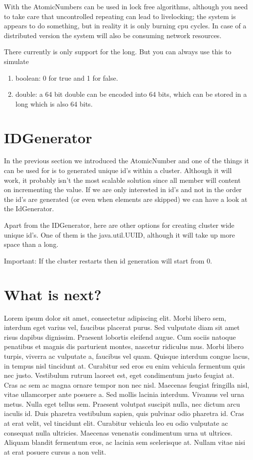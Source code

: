 With the AtomicNumbers can be used in lock free algorithms, although you need to 
take care that uncontrolled repeating can lead to livelocking; the system is appears to do
something, but in reality it is only burning cpu cycles. In case of a distributed version 
the system will also be consuming network resources. 

There currently is only support for the long. But you can always use this to simulate
\begin{enumerate}
\item boolean: 0 for true and 1 for false.
\item double: a 64 bit double can be encoded into 64 bits, which can be stored in a long which is also 64 bits.
\end{enumerate}

\section{IDGenerator}

In the previous section we introduced the AtomicNumber and one of the things it
can be used for is to generated unique id's within a cluster. Although it will work,
it probably isn't the most scalable solution since all member will content on incrementing
the value. If we are only interested in id's and not in the order the id's are generated 
(or even when elements are skipped) we can have a look at the IdGenerator.

Apart from the IDGenerator, here are other options for creating cluster wide unique id's.
One of them is the java.util.UUID, although it will take up more space than a long. 

Important: If the cluster restarts then id generation will start from 0.

\section{What is next?}
Lorem ipsum dolor sit amet, consectetur adipiscing elit. Morbi libero sem,
interdum eget varius vel, faucibus placerat purus. Sed vulputate diam sit amet
risus dapibus dignissim. Praesent lobortis eleifend augue. Cum sociis natoque
penatibus et magnis dis parturient montes, nascetur ridiculus mus. Morbi libero
turpis, viverra ac vulputate a, faucibus vel quam. Quisque interdum congue
lacus, in tempus nisl tincidunt at. Curabitur sed eros eu enim vehicula
fermentum quis nec justo. Vestibulum rutrum laoreet est, eget condimentum justo
feugiat at. Cras ac sem ac magna ornare tempor non nec nisl. Maecenas feugiat
fringilla nisl, vitae ullamcorper ante posuere a. Sed mollis lacinia interdum.
Vivamus vel urna metus. Nulla eget tellus sem. Praesent volutpat suscipit nulla,
nec dictum arcu iaculis id. Duis pharetra vestibulum sapien, quis pulvinar odio
pharetra id. Cras at erat velit, vel tincidunt elit. Curabitur vehicula leo eu
odio vulputate ac consequat nulla ultricies. Maecenas venenatis condimentum
urna ut ultrices. Aliquam blandit fermentum eros, ac lacinia sem scelerisque
at. Nullam vitae nisi at erat posuere cursus a non velit.
